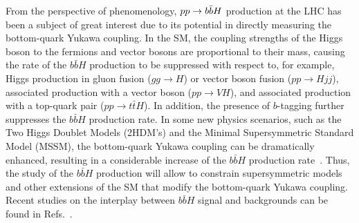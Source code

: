 \documentclass[main.tex]{subfiles}
\begin{document}
%

From the perspective of phenomenology, $pp \rightarrow b\bar{b}H$ production at the LHC has been a subject of great interest due to its
potential in directly measuring the bottom-quark Yukawa coupling. In the SM, the
coupling strengths of the Higgs boson to the fermions and vector bosons are proportional to their
mass, causing the rate of the $b\bar{b}H$ production to be suppressed with respect to, for example,
Higgs production in gluon fusion ($gg\to H$) or vector boson fusion ($pp\to Hjj$), associated
production with a vector boson ($pp\to VH$), and associated production with a top-quark pair ($pp\to
t\bar{t}H$). In addition, the presence of $b$-tagging further suppresses the $b\bar{b}H$ production
rate.  In some new physics scenarios, such as the Two Higgs Doublet Models (2HDM's) and the Minimal
Supersymmetric Standard Model (MSSM), the bottom-quark Yukawa coupling can be dramatically enhanced,
resulting in a considerable increase of the $b\bar{b}H$ production
rate~\cite{Balazs:1998nt,Dawson:2005vi}.  Thus, the study of the $b\bar{b}H$ production will allow
to constrain supersymmetric models and other extensions of the SM that modify the bottom-quark
Yukawa coupling. Recent studies on the interplay between $b\bar{b}H$ signal and backgrounds can be
found in Refs.~\cite{Pagani:2020rsg,Grojean:2020ech,Konar:2021nkk}.
\end{document}
